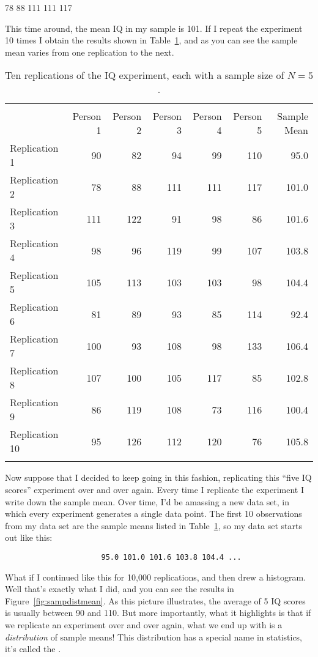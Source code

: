 \begin{rblock1}
78 88 111 111 117
\end{rblock1}

This time around, the mean IQ in my sample is 101. If I repeat the experiment 10 times I obtain the results shown in Table~\ref{tab:replications}, and as you can see the sample mean varies from one replication to the next. 

\begin{table}[t]
\centering
\caption{Ten replications of the IQ experiment, each with a sample size of $N=5$.}
\label{tab:replications}
\begin{tabular}{l|rrrrr|r}
 \multicolumn{6}{c}{} \\
 & Person 1 & Person 2 & Person 3 & Person 4 & Person 5 & Sample Mean \\ 
  \hline
Replication 1 & 90 & 82 & 94 & 99 & 110 & 95.0 \\ 
  Replication 2 & 78 & 88 & 111 & 111 & 117 & 101.0 \\ 
  Replication 3 & 111 & 122 & 91 & 98 & 86 & 101.6 \\ 
  Replication 4 & 98 & 96 & 119 & 99 & 107 & 103.8 \\ 
  Replication 5 & 105 & 113 & 103 & 103 & 98 & 104.4 \\ 
  Replication 6 & 81 & 89 & 93 & 85 & 114 & 92.4 \\ 
  Replication 7 & 100 & 93 & 108 & 98 & 133 & 106.4 \\ 
  Replication 8 & 107 & 100 & 105 & 117 & 85 & 102.8 \\ 
  Replication 9 & 86 & 119 & 108 & 73 & 116 & 100.4 \\ 
  Replication 10 & 95 & 126 & 112 & 120 & 76 & 105.8 \\ 
  \multicolumn{6}{c}{} \\
\end{tabular}
\HR
\end{table}

Now suppose that I decided to keep going in this fashion, replicating this ``five IQ scores'' experiment over and over again. Every time I replicate the experiment I write down the sample mean. Over time, I'd be amassing a new data set, in which every experiment generates a single data point. The first 10 observations from my data set are the sample means listed in Table~\ref{tab:replications}, so my data set starts out like this:
\begin{verbatim}
                      95.0 101.0 101.6 103.8 104.4 ...
\end{verbatim}
What if I continued like this for 10,000 replications, and then drew a histogram. Well that's exactly what I did, and you can see the results in Figure~\ref{fig:sampdistmean}. As this picture illustrates, the average of 5 IQ scores is usually between 90 and 110. But more importantly, what it highlights is that if we replicate an experiment over and over again, what we end up with is a {\it distribution} of sample means! This distribution has a special name in statistics, it's called the . 

